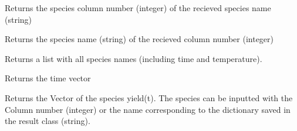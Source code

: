 \documentclass[letterpaper,10pt,english]{sphinxmanual}
\begin{document}
\begin{fulllineitems}
\begin{fulllineitems}
\end{fulllineitems}


\begin{fulllineitems}
\label{FittingClasses:Fit_one_run.Fit_one_run.SpeciesIndex}
Returns the species column number (integer) of the recieved species name (string)

\end{fulllineitems}


\begin{fulllineitems}
\label{FittingClasses:Fit_one_run.Fit_one_run.SpeciesName}
Returns the species name (string) of the recieved column number (integer)

\end{fulllineitems}


\begin{fulllineitems}
\label{FittingClasses:Fit_one_run.Fit_one_run.SpeciesNames}
Returns a list with all species names (including time and temperature).

\end{fulllineitems}


\begin{fulllineitems}
\label{FittingClasses:Fit_one_run.Fit_one_run.Time}
Returns the time vector

\end{fulllineitems}


\begin{fulllineitems}
\label{FittingClasses:Fit_one_run.Fit_one_run.Yield}
Returns the Vector of the species yield(t). The species can be inputted with the Column number (integer) or the name corresponding to the dictionary saved in the result class (string).

\end{fulllineitems}


\end{fulllineitems}
\end{document}
